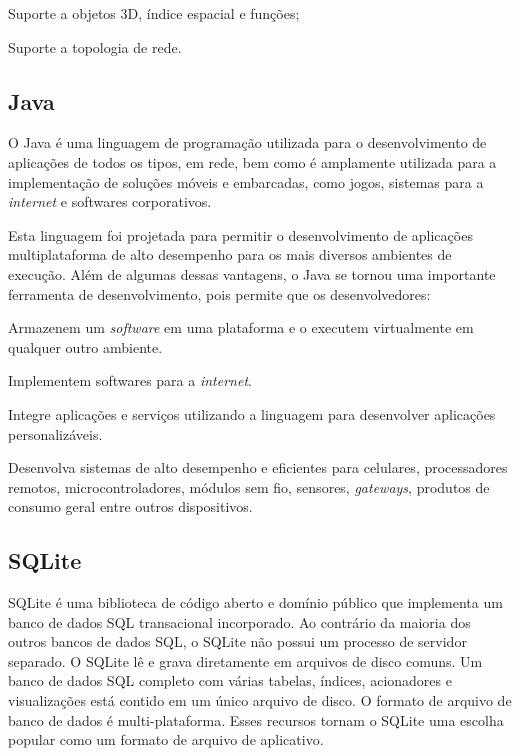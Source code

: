 {{{{{{{\begin{lista}
\item Suporte a objetos 3D, índice espacial e funções;

\item Suporte a topologia de rede.

\end{lista}
\subsection{Java}

O Java é uma linguagem de programação utilizada para o desenvolvimento de aplicações de todos os tipos, em rede, bem como é amplamente utilizada para a implementação de soluções móveis e embarcadas, como jogos, sistemas para a \textit{internet} e softwares corporativos.

Esta linguagem foi projetada para permitir o desenvolvimento de aplicações multiplataforma de alto desempenho para os mais diversos ambientes de execução. Além de algumas dessas vantagens, o Java se tornou uma importante ferramenta de desenvolvimento, pois permite que os desenvolvedores:

\begin{lista}
\item Armazenem um \textit{software} em uma plataforma e o executem virtualmente em qualquer outro ambiente.
\item Implementem softwares para a \textit{internet}.
\item Integre aplicações e serviços utilizando a linguagem para desenvolver aplicações personalizáveis.
\item Desenvolva sistemas de alto desempenho e eficientes para celulares, processadores remotos, microcontroladores, módulos sem fio, sensores, \textit{gateways}, produtos de consumo geral entre outros dispositivos.
\end{lista}

\subsection{SQLite}

SQLite é uma biblioteca de código aberto e domínio público que implementa um banco de dados SQL transacional incorporado. Ao contrário da maioria dos outros bancos de dados SQL, o SQLite não possui um processo de servidor separado. O SQLite lê e grava diretamente em arquivos de disco comuns. Um banco de dados SQL completo com várias tabelas, índices, acionadores e visualizações está contido em um único arquivo de disco. O formato de arquivo de banco de dados é multi-plataforma. Esses recursos tornam o SQLite uma escolha popular como um formato de arquivo de aplicativo.

}}}}}}}
